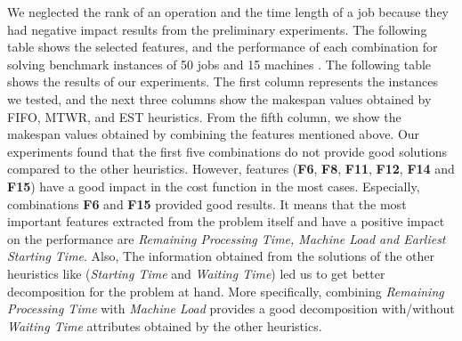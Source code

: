 \documentclass{article}
\begin{document}
We neglected the rank of an operation and the time length of a job because they had negative impact results from the preliminary experiments. The following table shows the selected features, and the performance of each combination for solving benchmark instances of 50 jobs and 15 machines \cite{taillard1993benchmarks}. The following table shows the results of our experiments. The first column represents the instances we tested, and the next three columns show the makespan values obtained by FIFO, MTWR, and EST heuristics. From the fifth column, we show the makespan values obtained by combining the features mentioned above. Our experiments found that the first five combinations do not provide good solutions compared to the other heuristics. However, features (\textbf{F6}, \textbf{F8}, \textbf{F11}, \textbf{F12}, \textbf{F14} and \textbf{F15}) have a good impact in the cost function in the most cases. Especially, combinations \textbf{F6} and \textbf{F15} provided good results. It means that the most important features extracted from the problem itself and have a positive impact on the performance are \textit{Remaining Processing Time, Machine Load and Earliest Starting Time}. Also, The information obtained from the solutions of the other heuristics like (\textit{Starting Time} and \textit{Waiting Time}) led us to get better decomposition for the problem at hand. More specifically, combining \textit{Remaining Processing Time} with \textit{Machine Load} provides a good decomposition with/without \textit{Waiting Time} attributes obtained by the other heuristics.
\end{document}
